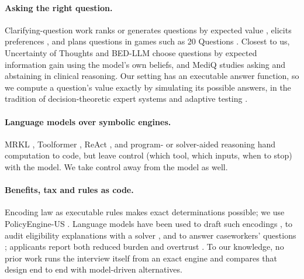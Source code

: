 \documentclass[11pt]{article}
\begin{document}
\paragraph{Asking the right question.} Clarifying-question work ranks or generates questions by expected value \citep{rao2018learning,aliannejadi2019asking,kuhn2022clam,tamkin2022taskambiguity}, elicits preferences \citep{li2023gate,andukuri2024stargate}, and plans questions in games such as 20 Questions \citep{zhang2023twentyq}. Closest to us, Uncertainty of Thoughts \citep{hu2024uot} and BED-LLM \citep{choudhury2025bedllm,hartmann2026amortising} choose questions by expected information gain using the model's own beliefs, and MediQ \citep{li2024mediq} studies asking and abstaining in clinical reasoning. Our setting has an executable answer function, so we compute a question's value exactly by simulating its possible answers, in the tradition of decision-theoretic expert systems \citep{howard1966information,gorry1968sequential,heckerman1992pathfinder} and adaptive testing \citep{weiss1984cat,vanderlinden2000cat}.

\paragraph{Language models over symbolic engines.} MRKL \citep{karpas2022mrkl}, Toolformer \citep{schick2023toolformer}, ReAct \citep{yao2022react}, and program- or solver-aided reasoning \citep{gao2022pal,lyu2023faithfulcot,pan2023logiclm,ye2023satlm,olausson2023linc} hand computation to code, but leave control (which tool, which inputs, when to stop) with the model. We take control away from the model as well.

\paragraph{Benefits, tax and rules as code.} Encoding law as executable rules \citep{merigoux2021catala,mohun2020crackingcode} makes exact determinations possible; we use PolicyEngine-US \citep{policyengineus}. Language models have been used to draft such encodings \citep{kennan2025airulesascode}, to audit eligibility explanations with a solver \citep{sunny2025neurosymbolic}, and to answer caseworkers' questions \citep{gosciak2026socialservices}; applicants report both reduced burden and overtrust \citep{jo2025trustburden}. To our knowledge, no prior work runs the interview itself from an exact engine and compares that design end to end with model-driven alternatives.
\end{document}
